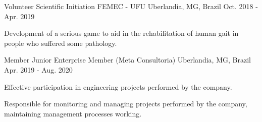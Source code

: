 

\begin{cventries}

  \cventry
    {Volunteer Scientific Initiation} %
    {FEMEC - UFU} %
    {Uberlandia, MG, Brazil} %
    {Oct. 2018 - Apr. 2019} %
    {
      \begin{cvitems} %
        \item {Development of a serious game to aid in the rehabilitation of human gait in people who suffered some pathology.}
      \end{cvitems}
    }

  \cventry
    {Member} %
    {Junior Enterprise Member (Meta Consultoria)} %
    {Uberlandia, MG, Brazil} %
    {Apr. 2019 - Aug. 2020} %
    {
      \begin{cvitems} %
        \item {Effective participation in engineering projects performed by the company.}
        \item {Responsible for monitoring and managing projects performed by the company, maintaining management processes working.}
      \end{cvitems}
    }

\end{cventries}
